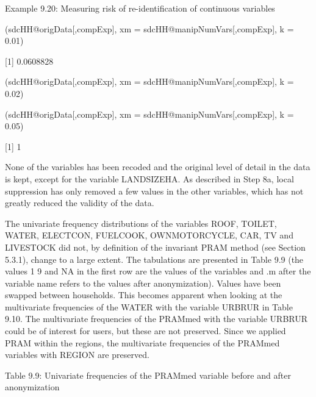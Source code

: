 \documentclass[letterpaper,10pt,english]{sphinxmanual}
\begin{document}
Example 9.20: Measuring risk of re-identification of continuous
variables

(sdcHH@origData{[},compExp{]}, xm = sdcHH@manipNumVars{[},compExp{]},
k = 0.01)

{[}1{]} 0.0608828

(sdcHH@origData{[},compExp{]}, xm = sdcHH@manipNumVars{[},compExp{]},
k = 0.02)


(sdcHH@origData{[},compExp{]}, xm = sdcHH@manipNumVars{[},compExp{]},
k = 0.05)

{[}1{]} 1


None of the variables has been recoded and the original level of detail
in the data is kept, except for the variable LANDSIZEHA. As described in
Step 8a, local suppression has only removed a few values in the other
variables, which has not greatly reduced the validity of the data.

The univariate frequency distributions of the variables ROOF, TOILET,
WATER, ELECTCON, FUELCOOK, OWNMOTORCYCLE, CAR, TV and LIVESTOCK did not,
by definition of the invariant PRAM method (see Section 5.3.1), change
to a large extent. The tabulations are presented in Table 9.9 (the
values 1 \textendash{} 9 and NA in the first row are the values of the variables and
.m after the variable name refers to the values after anonymization).
 Values have
been swapped between households. This becomes apparent when looking at
the multivariate frequencies of the WATER with the variable URBRUR in
Table 9.10. The multivariate frequencies of the PRAMmed with the
variable URBRUR could be of interest for users, but these are not
preserved. Since we applied PRAM within the regions, the multivariate
frequencies of the PRAMmed variables with REGION are preserved.

Table 9.9: Univariate frequencies of the PRAMmed variable before and
after anonymization
\end{document}
